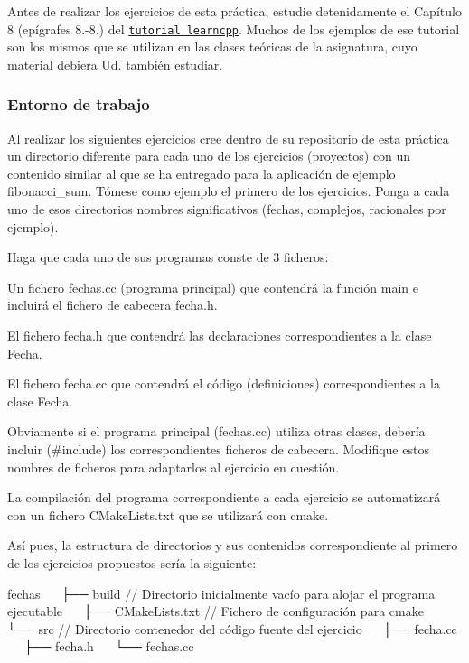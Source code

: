 Antes de realizar los ejercicios de esta práctica, estudie detenidamente el Capítulo 8 (epígrafes 8.-\/8.) del \href{https://www.learncpp.com/cpp-tutorial/81-welcome-to-object-oriented-programming/}{\tt tutorial learncpp}. Muchos de los ejemplos de ese tutorial son los mismos que se utilizan en las clases teóricas de la asignatura, cuyo material debiera Ud. también estudiar.

\subsubsection*{Entorno de trabajo}

Al realizar los siguientes ejercicios cree dentro de su repositorio de esta práctica un directorio diferente para cada uno de los ejercicios (proyectos) con un contenido similar al que se ha entregado para la aplicación de ejemplo {\ttfamily fibonacci\+\_\+sum}. Tómese como ejemplo el primero de los ejercicios. Ponga a cada uno de esos directorios nombres significativos (fechas, complejos, racionales por ejemplo).

Haga que cada uno de sus programas conste de 3 ficheros\+:
\begin{DoxyItemize}
\item Un fichero {\ttfamily fechas.\+cc} (programa principal) que contendrá la función {\ttfamily main} e incluirá el fichero de cabecera {\ttfamily fecha.\+h}.
\item El fichero {\ttfamily fecha.\+h} que contendrá las declaraciones correspondientes a la clase {\ttfamily Fecha}.
\item El fichero {\ttfamily fecha.\+cc} que contendrá el código (definiciones) correspondientes a la clase {\ttfamily Fecha}.
\item Obviamente si el programa principal ({\ttfamily fechas.\+cc}) utiliza otras clases, debería incluir ({\ttfamily \#include}) los correspondientes ficheros de cabecera. Modifique estos nombres de ficheros para adaptarlos al ejercicio en cuestión.
\end{DoxyItemize}

La compilación del programa correspondiente a cada ejercicio se automatizará con un fichero {\ttfamily C\+Make\+Lists.\+txt} que se utilizará con {\ttfamily cmake}.

Así pues, la estructura de directorios y sus contenidos correspondiente al primero de los ejercicios propuestos sería la siguiente\+: 
\begin{DoxyCode}
fechas
    ├── build           // Directorio inicialmente vacío para alojar el programa ejecutable
    ├── CMakeLists.txt  // Fichero de configuración para cmake
    └── src             // Directorio contenedor del código fuente del ejercicio
        ├── fecha.cc
        ├── fecha.h
        └── fechas.cc
\end{DoxyCode}


